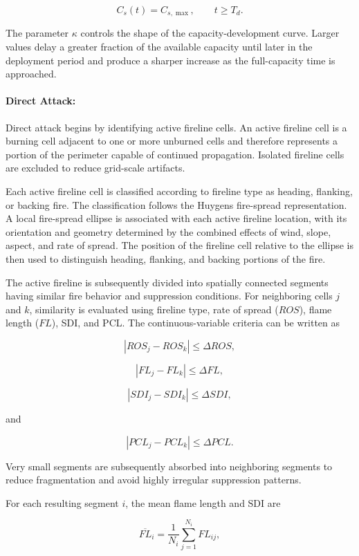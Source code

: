 \[
C_s(t)=C_{s,\max},
\qquad
t\geq T_d.
\]

The parameter $\kappa$ controls the shape of the capacity-development curve.
Larger values delay a greater fraction of the available capacity until later
in the deployment period and produce a sharper increase as the full-capacity
time is approached.


\paragraph{Direct Attack:}

Direct attack begins by identifying active fireline cells. An active fireline
cell is a burning cell adjacent to one or more unburned cells and therefore
represents a portion of the perimeter capable of continued propagation.
Isolated fireline cells are excluded to reduce grid-scale artifacts.

Each active fireline cell is classified according to fireline type as heading,
flanking, or backing fire. The classification follows the Huygens fire-spread
representation. A local fire-spread ellipse is associated with each active
fireline location, with its orientation and geometry determined by the combined
effects of wind, slope, aspect, and rate of spread. The position of the fireline
cell relative to the ellipse is then used to distinguish heading, flanking, and
backing portions of the fire.

The active fireline is subsequently divided into spatially connected segments
having similar fire behavior and suppression conditions. For neighboring cells
$j$ and $k$, similarity is evaluated using fireline type, rate of spread
($ROS$), flame length ($FL$), SDI, and PCL. The continuous-variable criteria can
be written as

\[
|ROS_j-ROS_k|
\leq
\Delta ROS,
\]

\[
|FL_j-FL_k|
\leq
\Delta FL,
\]

\[
|SDI_j-SDI_k|
\leq
\Delta SDI,
\]

and

\[
|PCL_j-PCL_k|
\leq
\Delta PCL.
\]

Very small segments are subsequently absorbed into neighboring segments to
reduce fragmentation and avoid highly irregular suppression patterns.

For each resulting segment $i$, the mean flame length and SDI are

\[
\overline{FL}_i
=
\frac{1}{N_i}
\sum_{j=1}^{N_i}FL_{ij},
\]

